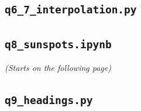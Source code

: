 \documentclass[a4paper, 11pt]{article}
\begin{document}
\newpage
\subsection{\texttt{q6\_7\_interpolation.py}}


\subsection{\texttt{q8\_sunspots.ipynb}}
\textit{(Starts on the following page)}


\newpage
\subsection{\texttt{q9\_headings.py}}

\end{document}

